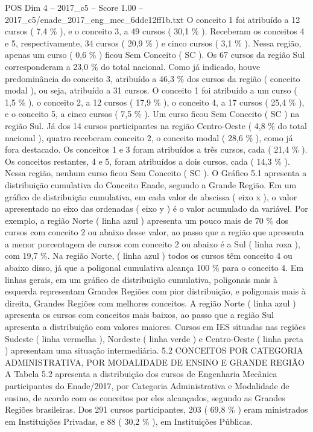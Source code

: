 \begin{textsample}{POS Dim 4 – 2017\_c5 – Score 1.00 – 2017\_c5/enade\_2017\_eng\_mec\_6ddc12ff1b.txt}
O conceito 1 foi atribuído a 12 cursos ( 7,4 \% ), e o conceito 3, a 49 cursos ( 30,1 \% ).
Receberam os conceitos 4 e 5, respectivamente, 34 cursos ( 20,9 \% ) e cinco cursos ( 3,1 \% ).
Nessa região, apenas um curso ( 0,6 \% ) ficou Sem Conceito ( SC ).
Os 67 cursos da região Sul corresponderam a 23,0 \% do total nacional.
Como já indicado, houve predominância do conceito 3, atribuído a 46,3 \% dos cursos da região ( conceito modal ), ou seja, atribuído a 31 cursos.
O conceito 1 foi atribuído a um curso ( 1,5 \% ), o conceito 2, a 12 cursos ( 17,9 \% ), o conceito 4, a 17 cursos ( 25,4 \% ), e o conceito 5, a cinco cursos ( 7,5 \% ).
Um curso ficou Sem Conceito ( SC ) na região Sul.
Já dos 14 cursos participantes na região Centro-Oeste ( 4,8 \% do total nacional ), quatro receberam conceito 2, o conceito modal ( 28,6 \% ), como já fora destacado.
Os conceitos 1 e 3 foram atribuídos a três cursos, cada ( 21,4 \% ).
Os conceitos restantes, 4 e 5, foram atribuídos a dois cursos, cada ( 14,3 \% ).
Nessa região, nenhum curso ficou Sem Conceito ( SC ).
O Gráfico 5.1 apresenta a distribuição cumulativa do Conceito Enade, segundo a Grande Região.
Em um gráfico de distribuição cumulativa, em cada valor de abscissa ( eixo x ), o valor apresentado no eixo das ordenadas ( eixo y ) é o valor acumulado da variável.
Por exemplo, a região Norte ( linha azul ) apresenta um pouco mais de 70 \% dos cursos com conceito 2 ou abaixo desse valor, ao passo que a região que apresenta a menor porcentagem de cursos com conceito 2 ou abaixo é a Sul ( linha roxa ), com 19,7 \%.
Na região Norte, ( linha azul ) todos os cursos têm conceito 4 ou abaixo disso, já que a poligonal cumulativa alcança 100 \% para o conceito 4.
Em linhas gerais, em um gráfico de distribuição cumulativa, poligonais mais à esquerda representam Grandes Regiões com pior distribuição, e poligonais mais à direita, Grandes Regiões com melhores conceitos.
A região Norte ( linha azul ) apresenta os cursos com conceitos mais baixos, ao passo que a região Sul apresenta a distribuição com valores maiores.
Cursos em IES situadas nas regiões Sudeste ( linha vermelha ), Nordeste ( linha verde ) e Centro-Oeste ( linha preta ) apresentam uma situação intermediária. 5.2 CONCEITOS POR CATEGORIA ADMINISTRATIVA, POR MODALIDADE DE ENSINO E GRANDE REGIÃO A Tabela 5.2 apresenta a distribuição dos cursos de Engenharia Mecânica participantes do Enade/2017, por Categoria Administrativa e Modalidade de ensino, de acordo com os conceitos por eles alcançados, segundo as Grandes Regiões brasileiras.
Dos 291 cursos participantes, 203 ( 69,8 \% ) eram ministrados em Instituições Privadas, e 88 ( 30,2 \% ), em Instituições Públicas.

\end{textsample}
